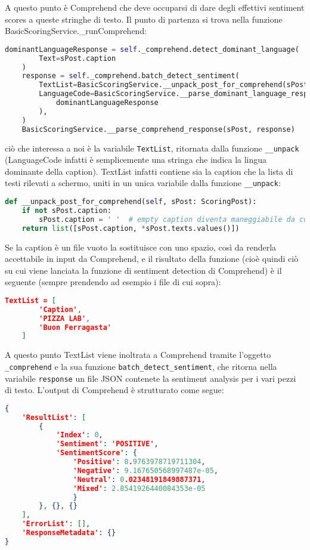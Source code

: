 A questo punto è Comprehend che deve occuparsi di dare degli effettivi sentiment
scores a queste stringhe di testo.
Il punto di partenza si trova nella funzione BasicScoringService.\_runComprehend:
\begin{lstlisting}[language=Python]
    dominantLanguageResponse = self._comprehend.detect_dominant_language(
        Text=sPost.caption
    )
    response = self._comprehend.batch_detect_sentiment(
        TextList=BasicScoringService.__unpack_post_for_comprehend(sPost),
        LanguageCode=BasicScoringService.__parse_dominant_language_response(
            dominantLanguageResponse
        ),
    )
    BasicScoringService.__parse_comprehend_response(sPost, response)
\end{lstlisting}
ciò che interessa a noi è la variabile \verb+TextList+, ritornata dalla funzione \verb+__unpack+ 
(LanguageCode infatti è semplicemente una stringa che indica la lingua dominante della caption).
TextList infatti contiene sia la caption che la lista di testi rilevati a schermo, uniti in un
unica variabile dalla funzione \verb+__unpack+:
\begin{lstlisting}[language=Python]
def __unpack_post_for_comprehend(self, sPost: ScoringPost):
    if not sPost.caption:
        sPost.caption = ' '  # empty caption diventa maneggiabile da comprehend
    return list([sPost.caption, *sPost.texts.values()])
\end{lstlisting}
Se la caption è un file vuoto la sostituisce con uno spazio, così da renderla accettabile in input
da Comprehend, e il risultato della funzione (cioè quindi ciò su cui viene lanciata la funzione di
sentiment detection di Comprehend) è il seguente (sempre prendendo ad esempio i file di cui sopra):
\begin{lstlisting}[language=JSON]
    TextList = [
        'Caption',
        'PIZZA LAB',
        'Buon Ferragasta'
    ]
\end{lstlisting}
A questo punto TextList viene inoltrata a Comprehend tramite l'oggetto \verb+_comprehend+ e la sua
funzione \verb+batch_detect_sentiment+, che ritorna nella variabile \verb+response+ un file JSON
contenete la sentiment analysis per i vari pezzi di testo. 
L'output di Comprehend è strutturato come segue:
\begin{lstlisting}[language=JSON]
{
    'ResultList': [
        {
            'Index': 0, 
            'Sentiment': 'POSITIVE', 
            'SentimentScore': {
                'Positive': 0.9763978719711304, 
                'Negative': 9.167650568997487e-05, 
                'Neutral': 0.02348191849887371, 
                'Mixed': 2.8541926440084353e-05
                }
        }, {}, {}
    ], 
    'ErrorList': [], 
    'ResponseMetadata': {}
}
\end{lstlisting}
